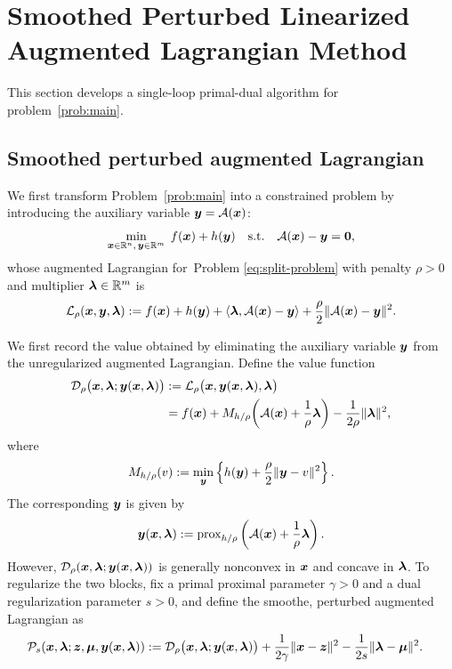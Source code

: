 \section{Smoothed Perturbed Linearized Augmented Lagrangian Method}
\label{sec:method}

This section develops a single-loop primal-dual algorithm for problem~\eqref{prob:main}.  

\subsection{Smoothed perturbed augmented Lagrangian}
\label{subsec:dual-damping-reformulation}
We first transform Problem~\eqref{prob:main} into a constrained problem by introducing the auxiliary variable \(\bm{y}=\mathcal{A}(\bm{x})\):
\begin{equation}\label{eq:split-problem}
    \min_{\bm{x}\in\mathbb{R}^n,\,\bm{y}\in\mathbb{R}^m}
    \; f(\bm{x})+ h(\bm{y})
    \quad\text{s.t.}\quad
    \mathcal{A}(\bm{x})-\bm{y}=\bm{0},
\end{equation} whose augmented Lagrangian for~Problem \eqref{eq:split-problem} with penalty
\(\rho>0\) and multiplier \(\bm{\lambda}\in\mathbb{R}^m\) is
\begin{equation}\label{eq:augmented-lagrangian}
    \mathcal{L}_\rho(\bm{x},\bm{y},\bm{\lambda})
    :=
    f(\bm{x})+h(\bm{y})
    +\langle \bm{\lambda},\mathcal{A}(\bm{x})-\bm{y}\rangle
    +\frac{\rho}{2}\|\mathcal{A}(\bm{x})-\bm{y}\|^2.
\end{equation}

We first record the value obtained by eliminating the auxiliary variable
\(\bm{y}\) from the unregularized augmented Lagrangian.  Define the value function
\begin{equation}\label{eq:reduced-al-base}
    \begin{aligned}
        \mathcal D_\rho\bigl(\bm{x},\bm{\lambda}; \bm{y}(\bm{x},\bm{\lambda})\bigr)
        &:=\mathcal L_\rho\bigl(\bm{x},\bm{y}(\bm{x},\bm{\lambda}),\bm{\lambda}\bigr) \\
        &=f(\bm{x})
        +M_{h/\rho}\!\left(\mathcal{A}(\bm{x})+\frac{1}{\rho}\bm{\lambda}\right)
        -\frac{1}{2\rho}\|\bm{\lambda}\|^2,
    \end{aligned}
\end{equation}
where
\[
    M_{h/\rho}(v):=\min_{\bm{y}}\left\{
        h(\bm{y})+\frac{\rho}{2}\|\bm{y}-v\|^2
    \right\}.
\]
The corresponding \(\bm{y}\) is given by
\begin{equation}\label{eq:rho-prox-map}
    \bm{y} (\bm{x},\bm{\lambda})
    :=\operatorname{prox}_{h/\rho}
      \left(\mathcal{A}(\bm{x})+\frac{1}{\rho}\bm{\lambda}\right).
\end{equation}
However, \(\mathcal D_\rho(\bm{x},\bm{\lambda};\bm{y}(\bm{x},\bm{\lambda}))\) is generally nonconvex in \(\bm{x}\)
and concave in \(\bm{\lambda}\). To regularize the two blocks, fix a primal
proximal parameter \(\gamma>0\) and a dual regularization parameter \(s>0\),
and define the smoothe, perturbed augmented Lagrangian as
\begin{equation}\label{eq:regularized-potential}
    \begin{aligned}
        \mathcal P_s(\bm{x},\bm{\lambda};\bm{z},\bm{\mu},\bm{y}(\bm{x},\bm{\lambda}) )
        :=\;&  \mathcal D_\rho\bigl(\bm{x},\bm{\lambda};\bm{y}(\bm{x},\bm{\lambda})\bigr)
        +\frac{1}{2\gamma}\|\bm{x}-\bm{z}\|^2
        -\frac{1}{2s}\|\bm{\lambda}-\bm{\mu}\|^2.
    \end{aligned}
\end{equation} 

